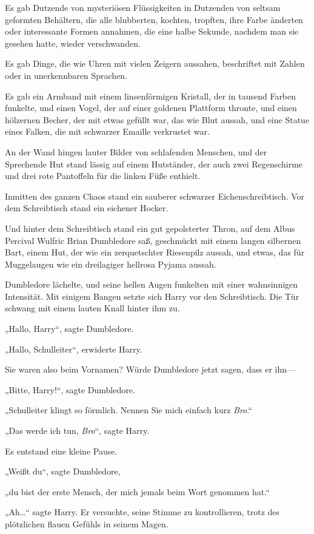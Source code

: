{Es gab Dutzende von mysteriösen Flüssigkeiten in Dutzenden von seltsam geformten Behältern, die alle blubberten, kochten, tropften, ihre Farbe änderten oder interessante Formen annahmen, die eine halbe Sekunde, nachdem man sie gesehen hatte, wieder verschwanden.

Es gab Dinge, die wie Uhren mit vielen Zeigern aussahen, beschriftet mit Zahlen oder in unerkennbaren Sprachen.

Es gab ein Armband mit einem linsenförmigen Kristall, der in tausend Farben funkelte, und einen Vogel, der auf einer goldenen Plattform thronte, und einen hölzernen Becher, der mit etwas gefüllt war, das wie Blut aussah, und eine Statue eines Falken, die mit schwarzer Emaille verkrustet war.

An der Wand hingen lauter Bilder von schlafenden Menschen, und der Sprechende Hut stand lässig auf einem Hutständer, der auch zwei Regenschirme und drei rote Pantoffeln für die linken Füße enthielt.

Inmitten des ganzen Chaos stand ein sauberer schwarzer Eichenschreibtisch. Vor dem Schreibtisch stand ein eichener Hocker.

Und hinter dem Schreibtisch stand ein gut gepolsterter Thron, auf dem Albus Percival Wulfric Brian Dumbledore saß, geschmückt mit einem langen silbernen Bart, einem Hut, der wie ein zerquetschter Riesenpilz aussah, und etwas, das für Muggelaugen wie ein dreilagiger hellrosa Pyjama aussah.

Dumbledore lächelte, und seine hellen Augen funkelten mit einer wahnsinnigen Intensität. Mit einigem Bangen setzte sich Harry vor den Schreibtisch. Die Tür schwang mit einem lauten Knall hinter ihm zu.

„Hallo, Harry“, sagte Dumbledore.

„Hallo, Schulleiter“, erwiderte Harry.

Sie waren also beim Vornamen? Würde Dumbledore jetzt sagen, dass er ihn—

„Bitte, Harry!“, sagte Dumbledore.

„Schulleiter klingt so förmlich. Nennen Sie mich einfach kurz \emph{Bro}.“

„Das werde ich tun, \emph{Bro}“, sagte Harry.

Es entstand eine kleine Pause.

„Weißt du“, sagte Dumbledore,

„du bist der erste Mensch, der mich jemals beim Wort genommen hat.“

„Ah…“ sagte Harry. Er versuchte, seine Stimme zu kontrollieren, trotz des plötzlichen flauen Gefühls in seinem Magen.

}
